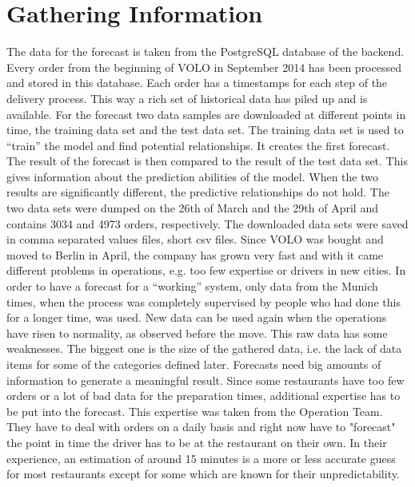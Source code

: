 \section{Gathering Information}\label{section:Gathering Information}
The data for the forecast is taken from the PostgreSQL database of the backend. Every order from the beginning of VOLO in September 2014 has been processed and stored in this database. Each order has a timestamps for each step of the delivery process. This way a rich set of historical data has piled up and is available. For the forecast two data samples are downloaded at different points in time, the training data set and the test data set. The training data set is used to “train” the model and find potential relationships. It creates the first forecast. The result of the forecast is then compared to the result of the test data set. This gives information about the prediction abilities of the model. When the two results are significantly different, the predictive relationships do not hold. The two data sets were dumped on the 26th of March and the 29th of April and contains 3034 and 4973 orders, respectively. The downloaded data sets were saved in comma separated values files, short csv files. Since VOLO was bought and moved to Berlin in April, the company has grown very fast and with it came different problems in operations, e.g. too few expertise or drivers in new cities. In order to have a forecast for a “working” system, only data from the Munich times, when the process was completely supervised by people who had done this for a longer time, was used. New data can be used again when the operations have risen to normality, as observed before the move.\newline
This raw data has some weaknesses. The biggest one is the size of the gathered data, i.e. the lack of data items for some of the categories defined later. Forecasts need big amounts of information to generate a meaningful result. Since some restaurants have too few orders or a lot of bad data for the preparation times, additional expertise has to be put into the forecast. This expertise was taken from the Operation Team. They have to deal with orders on a daily basis and right now have to "forecast" the point in time the driver has to be at the restaurant on their own. In their experience, an estimation of around 15 minutes is a more or less accurate guess for most restaurants except for some which are known for their unpredictability.\newline
